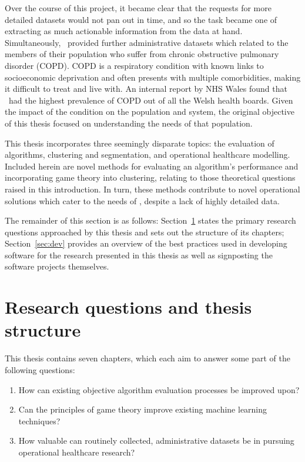 Over the course of this project, it became clear that the requests for more
detailed datasets would not pan out in time, and so the task became one of
extracting as much actionable information from the data at hand. Simultaneously,
\ctmuhb\ provided further administrative datasets which related to the members
of their population who suffer from chronic obstructive pulmonary disorder
(COPD). COPD is a respiratory condition with known links to socioeconomic
deprivation and often presents with multiple comorbidities, making it difficult
to treat and live with. An internal report by NHS Wales found that \ctmuhb\ had
the highest prevalence of COPD out of all the Welsh health boards. Given the
impact of the condition on the population and system, the original objective of
this thesis focused on understanding the needs of that population.

This thesis incorporates three seemingly disparate topics: the evaluation of
algorithms, clustering and segmentation, and operational healthcare modelling.
Included herein are novel methods for evaluating an algorithm's performance and
incorporating game theory into clustering, relating to those theoretical
questions raised in this introduction. In turn, these methods contribute to
novel operational solutions which cater to the needs of \ctmuhb, despite a lack
of highly detailed data.

The remainder of this section is as follows: Section~\ref{sec:questions} states
the primary research questions approached by this thesis and sets out the
structure of its chapters; Section~\ref{sec:dev} provides an overview of the
best practices used in developing software for the research presented in this
thesis as well as signposting the software projects themselves.

\section{Research questions and thesis structure}\label{sec:questions}

This thesis contains seven chapters, which each aim to answer some part of the
following questions:

\begin{enumerate}
    \item How can existing objective algorithm evaluation processes be improved
        upon?
    \item Can the principles of game theory improve existing machine learning
        techniques?
    \item How valuable can routinely collected, administrative datasets be in
        pursuing operational healthcare research?
\end{enumerate}

